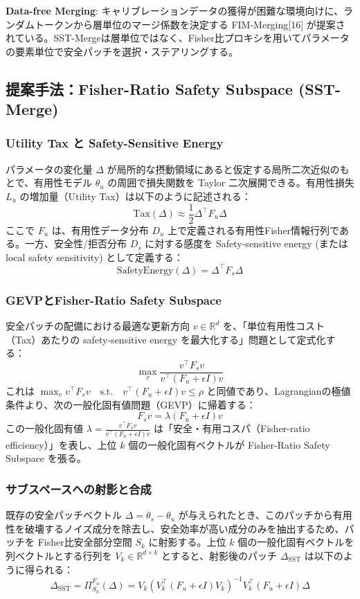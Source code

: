 \documentclass{article}
\begin{document}
\textbf{Data-free Merging}: キャリブレーションデータの獲得が困難な環境向けに、ランダムトークンから層単位のマージ係数を決定する FIM-Merging[16] が提案されている。SST-Mergeは層単位ではなく、Fisher比プロキシを用いてパラメータの要素単位で安全パッチを選択・ステアリングする。

\subsection{提案手法：Fisher-Ratio Safety Subspace (SST-Merge)}

\subsubsection{Utility Tax と Safety-Sensitive Energy}
パラメータの変化量 $\Delta$ が局所的な摂動領域にあると仮定する局所二次近似のもとで、有用性モデル $\theta_u$ の周囲で損失関数を Taylor 二次展開できる。有用性損失 $L_u$ の増加量（Utility Tax）は以下のように記述される：
\[ \text{Tax}(\Delta) \approx \frac{1}{2} \Delta^\top F_u \Delta \]
ここで $F_u$ は、有用性データ分布 $D_u$ 上で定義される有用性Fisher情報行列である。一方、安全性/拒否分布 $D_s$ に対する感度を Safety-sensitive energy (または local safety sensitivity) として定義する：
\[ \text{SafetyEnergy}(\Delta) = \Delta^\top F_s \Delta \]

\subsubsection{GEVPとFisher-Ratio Safety Subspace}
安全パッチの配備における最適な更新方向 $v \in \mathbb{R}^d$ を、「単位有用性コスト（Tax）あたりの safety-sensitive energy を最大化する」問題として定式化する：
\[ \max_v \frac{v^\top F_s v}{v^\top (F_u + \epsilon I) v} \]
これは $\max_v v^\top F_s v \quad \text{s.t.} \quad v^\top (F_u + \epsilon I) v \le \rho$ と同値であり、Lagrangianの極値条件より、次の一般化固有値問題（GEVP）に帰着する：
\[ F_s v = \lambda (F_u + \epsilon I) v \]
この一般化固有値 $\lambda = \frac{v^\top F_s v}{v^\top (F_u + \epsilon I) v}$ は「安全・有用コスパ（Fisher-ratio efficiency）」を表し、上位 $k$ 個の一般化固有ベクトルが Fisher-Ratio Safety Subspace を張る。

\subsubsection{サブスペースへの射影と合成}
既存の安全パッチベクトル $\Delta = \theta_s - \theta_u$ が与えられたとき、このパッチから有用性を破壊するノイズ成分を除去し、安全効率が高い成分のみを抽出するため、パッチを Fisher比安全部分空間 $S_k$ に射影する。上位 $k$ 個の一般化固有ベクトルを列ベクトルとする行列を $V_k \in \mathbb{R}^{d \times k}$ とすると、射影後のパッチ $\Delta_{\text{SST}}$ は以下のように得られる：
\[ \Delta_{\text{SST}} = \Pi_{S_k}^{F_u} (\Delta) = V_k (V_k^\top (F_u + \epsilon I) V_k)^{-1} V_k^\top (F_u + \epsilon I) \Delta \]
\end{document}
